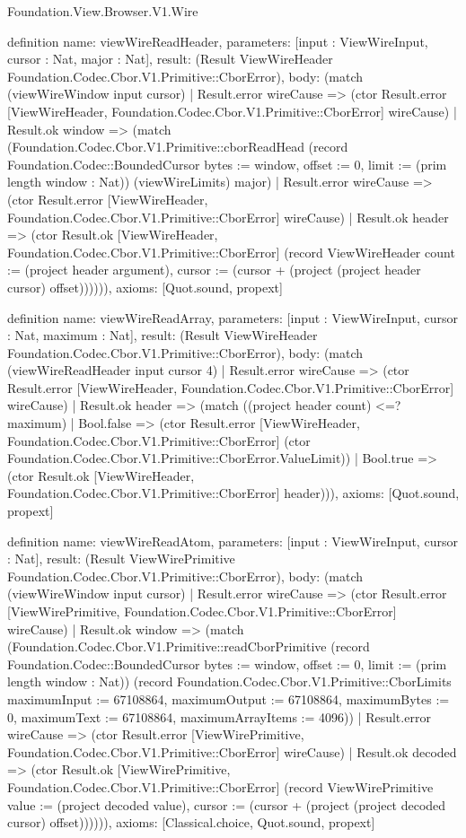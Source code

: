 \begin{lexlean}{Foundation.View.Browser.V1.Wire}
\begin{semanticmodule}
definition{
  name: viewWireReadHeader,
  parameters: [input : ViewWireInput, cursor : Nat, major : Nat],
  result: (Result ViewWireHeader Foundation.Codec.Cbor.V1.Primitive::CborError),
  body: (match (viewWireWindow input cursor)
    | Result.error wireCause => (ctor Result.error [ViewWireHeader, Foundation.Codec.Cbor.V1.Primitive::CborError] wireCause)
    | Result.ok window => (match (Foundation.Codec.Cbor.V1.Primitive::cborReadHead (record Foundation.Codec::BoundedCursor {bytes := window, offset := 0, limit := (prim length window : Nat)}) (viewWireLimits) major)
      | Result.error wireCause => (ctor Result.error [ViewWireHeader, Foundation.Codec.Cbor.V1.Primitive::CborError] wireCause)
      | Result.ok header => (ctor Result.ok [ViewWireHeader, Foundation.Codec.Cbor.V1.Primitive::CborError] (record ViewWireHeader {count := (project header argument), cursor := (cursor + (project (project header cursor) offset))})))),
  axioms: [Quot.sound, propext]
}

definition{
  name: viewWireReadArray,
  parameters: [input : ViewWireInput, cursor : Nat, maximum : Nat],
  result: (Result ViewWireHeader Foundation.Codec.Cbor.V1.Primitive::CborError),
  body: (match (viewWireReadHeader input cursor 4)
    | Result.error wireCause => (ctor Result.error [ViewWireHeader, Foundation.Codec.Cbor.V1.Primitive::CborError] wireCause)
    | Result.ok header => (match ((project header count) <=? maximum)
      | Bool.false => (ctor Result.error [ViewWireHeader, Foundation.Codec.Cbor.V1.Primitive::CborError] (ctor Foundation.Codec.Cbor.V1.Primitive::CborError.ValueLimit))
      | Bool.true => (ctor Result.ok [ViewWireHeader, Foundation.Codec.Cbor.V1.Primitive::CborError] header))),
  axioms: [Quot.sound, propext]
}

definition{
  name: viewWireReadAtom,
  parameters: [input : ViewWireInput, cursor : Nat],
  result: (Result ViewWirePrimitive Foundation.Codec.Cbor.V1.Primitive::CborError),
  body: (match (viewWireWindow input cursor)
    | Result.error wireCause => (ctor Result.error [ViewWirePrimitive, Foundation.Codec.Cbor.V1.Primitive::CborError] wireCause)
    | Result.ok window => (match (Foundation.Codec.Cbor.V1.Primitive::readCborPrimitive (record Foundation.Codec::BoundedCursor {bytes := window, offset := 0, limit := (prim length window : Nat)}) (record Foundation.Codec.Cbor.V1.Primitive::CborLimits {maximumInput := 67108864, maximumOutput := 67108864, maximumBytes := 0, maximumText := 67108864, maximumArrayItems := 4096}))
      | Result.error wireCause => (ctor Result.error [ViewWirePrimitive, Foundation.Codec.Cbor.V1.Primitive::CborError] wireCause)
      | Result.ok decoded => (ctor Result.ok [ViewWirePrimitive, Foundation.Codec.Cbor.V1.Primitive::CborError] (record ViewWirePrimitive {value := (project decoded value), cursor := (cursor + (project (project decoded cursor) offset))})))),
  axioms: [Classical.choice, Quot.sound, propext]
}


\end{semanticmodule}
\end{lexlean}
